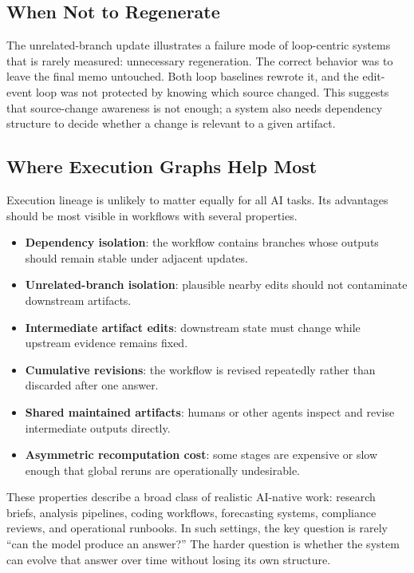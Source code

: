 \documentclass{article}
\begin{document}
\subsection{When Not to Regenerate}

The unrelated-branch update illustrates a failure mode of loop-centric systems that is rarely measured: unnecessary regeneration. The correct behavior was to leave the final memo untouched. Both loop baselines rewrote it, and the edit-event loop was not protected by knowing which source changed. This suggests that source-change awareness is not enough; a system also needs dependency structure to decide whether a change is relevant to a given artifact.

\subsection{Where Execution Graphs Help Most}

Execution lineage is unlikely to matter equally for all AI tasks. Its advantages should be most visible in workflows with several properties.

\begin{itemize}
\item \textbf{Dependency isolation}: the workflow contains branches whose outputs should remain stable under adjacent updates.
\item \textbf{Unrelated-branch isolation}: plausible nearby edits should not contaminate downstream artifacts.
\item \textbf{Intermediate artifact edits}: downstream state must change while upstream evidence remains fixed.
\item \textbf{Cumulative revisions}: the workflow is revised repeatedly rather than discarded after one answer.
\item \textbf{Shared maintained artifacts}: humans or other agents inspect and revise intermediate outputs directly.
\item \textbf{Asymmetric recomputation cost}: some stages are expensive or slow enough that global reruns are operationally undesirable.
\end{itemize}

These properties describe a broad class of realistic AI-native work: research briefs, analysis pipelines, coding workflows, forecasting systems, compliance reviews, and operational runbooks. In such settings, the key question is rarely ``can the model produce an answer?'' The harder question is whether the system can evolve that answer over time without losing its own structure.
\end{document}
